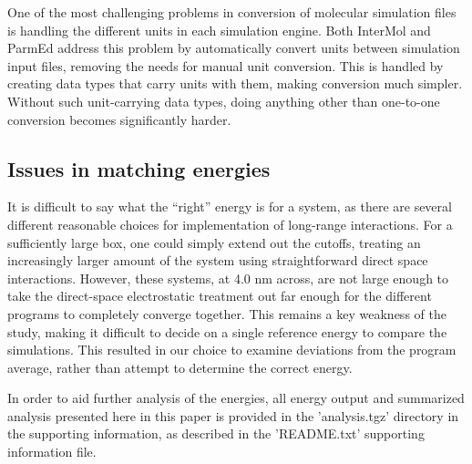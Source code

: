  One of the most challenging problems in conversion of molecular
 simulation files is handling the different units in each simulation
 engine. Both InterMol and ParmEd address this problem by
 automatically convert units between simulation input files, removing
 the needs for manual unit conversion. This is handled by creating
 data types that carry units with them, making conversion much
 simpler.  Without such unit-carrying data types, doing anything other
 than one-to-one conversion becomes significantly harder.

\subsection*{Issues in matching energies}

It is difficult to say what the ``right'' energy is for a system, as
there are several different reasonable choices for implementation of
long-range interactions. For a sufficiently large box, one could
simply extend out the cutoffs, treating an increasingly larger amount
of the system using straightforward direct space interactions.
However, these systems, at 4.0 nm across, are not large enough to take
the direct-space electrostatic treatment out far enough for the
different programs to completely converge together.  This remains a
key weakness of the study, making it difficult to decide on a single
reference energy to compare the simulations. This resulted in our
choice to examine deviations from the program average, rather than
attempt to determine the correct energy. 

In order to aid further analysis of the energies, all energy output
and summarized analysis presented here in this paper is provided in
the 'analysis.tgz' directory in the supporting information, as
described in the 'README.txt' supporting information file.


